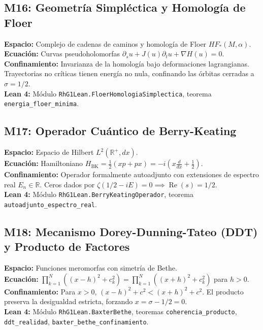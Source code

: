\documentclass[11pt,a4paper]{article}
\begin{document}
\subsection{M16: Geometría Simpléctica y Homología de Floer}
\textbf{Espacio:} Complejo de cadenas de caminos y homología de Floer $HF_*(M, \alpha)$.\\
\textbf{Ecuación:} Curvas pseudoholomorfas $\partial_s u + J(u)\partial_t u + \nabla H(u) = 0$.\\
\textbf{Confinamiento:} Invarianza de la homología bajo deformaciones lagrangianas. Trayectorias no críticas tienen energía no nula, confinando las órbitas cerradas a $\sigma = 1/2$.\\
\textbf{Lean 4:} Módulo \texttt{RhG1Lean.FloerHomologiaSimplectica}, teorema \texttt{energia\_floer\_minima}.

\subsection{M17: Operador Cuántico de Berry-Keating}
\textbf{Espacio:} Espacio de Hilbert $L^2(\mathbb{R}^+, dx)$.\\
\textbf{Ecuación:} Hamiltoniano $H_{\text{BK}} = \frac{1}{2}(xp + px) = -i(x \frac{d}{dx} + \frac{1}{2})$.\\
\textbf{Confinamiento:} Operador formalmente autoadjunto con extensiones de espectro real $E_n \in \mathbb{R}$. Ceros dados por $\zeta(1/2 - iE) = 0 \implies \operatorname{Re}(s) = 1/2$.\\
\textbf{Lean 4:} Módulo \texttt{RhG1Lean.BerryKeatingOperador}, teorema \texttt{autoadjunto\_espectro\_real}.

\subsection{M18: Mecanismo Dorey-Dunning-Tateo (DDT) y Producto de Factores}
\textbf{Espacio:} Funciones meromorfas con simetría de Bethe.\\
\textbf{Ecuación:} $\prod_{k=1}^N ((x-h)^2 + c_k^2) = \prod_{k=1}^N ((x+h)^2 + c_k^2)$ para $h > 0$.\\
\textbf{Confinamiento:} Para $x > 0$, $(x-h)^2 + c^2 < (x+h)^2 + c^2$. El producto preserva la desigualdad estricta, forzando $x = \sigma - 1/2 = 0$.\\
\textbf{Lean 4:} Módulo \texttt{RhG1Lean.BaxterBethe}, teoremas \texttt{coherencia\_producto}, \texttt{ddt\_realidad}, \texttt{baxter\_bethe\_confinamiento}.
\end{document}
